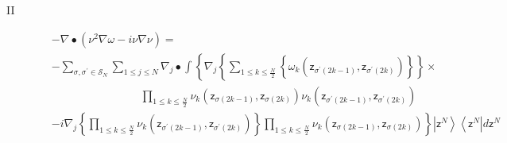 \documentclass[aps,preprint]{revtex4}%
\begin{document}
\begin{description}
\item[II]
\begin{align}
&  -\nabla\bullet\left(  \nu^{2}\nabla\omega-i\nu\nabla\nu\right)  \left.
=\right. \nonumber\\
&  -%
{\textstyle\sum\limits_{\sigma,\sigma^{\prime}\in\mathcal{S}_{N}}}
{\displaystyle\sum\limits_{1\leq j\leq N}}
\nabla_{j}\bullet\int\left\{  \nabla_{j}\left\{
{\displaystyle\sum\limits_{1\leq k\leq\frac{N}{2}}}
\left\{  \omega_{k}\left(  \mathsf{z}_{\sigma^{\prime}\left(  2k-1\right)
},\mathsf{z}_{\sigma^{\prime}\left(  2k\right)  }\right)  \right\}  \right\}
\right.  \times\nonumber\\
&  \qquad\qquad\qquad\qquad%
{\displaystyle\prod\limits_{1\leq k\leq\frac{N}{2}}}
\nu_{k}\left(  \mathsf{z}_{\sigma\left(  2k-1\right)  },\mathsf{z}%
_{\sigma\left(  2k\right)  }\right)  \nu_{k}\left(  \mathsf{z}_{\sigma
^{\prime}\left(  2k-1\right)  },\mathsf{z}_{\sigma^{\prime}\left(  2k\right)
}\right) \nonumber\\
&  \left.  -i\nabla_{j}\left\{
{\displaystyle\prod\limits_{1\leq k\leq\frac{N}{2}}}
\nu_{k}\left(  \mathsf{z}_{\sigma^{\prime}\left(  2k-1\right)  }%
,\mathsf{z}_{\sigma^{\prime}\left(  2k\right)  }\right)  \right\}
{\displaystyle\prod\limits_{1\leq k\leq\frac{N}{2}}}
\nu_{k}\left(  \mathsf{z}_{\sigma\left(  2k-1\right)  },\mathsf{z}%
_{\sigma\left(  2k\right)  }\right)  \right\}  \left\vert \mathsf{z}%
^{N}\right\rangle \left\langle \mathsf{z}^{N}\right\vert d\mathsf{z}^{N}%
\end{align}



\end{description}
\end{document}
